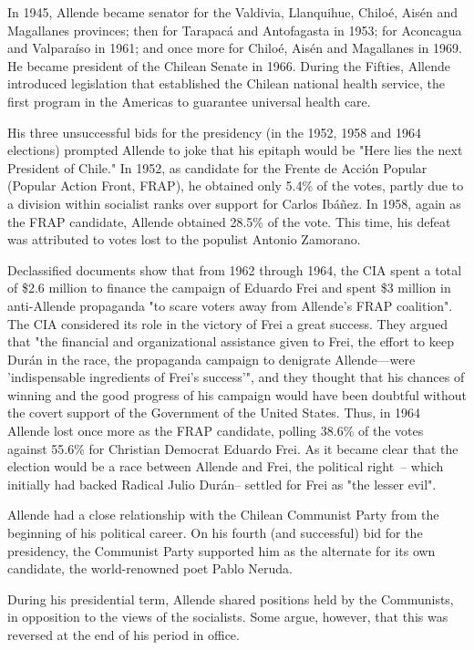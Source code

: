 In 1945, Allende became senator for the Valdivia, Llanquihue, Chiloé,
Aisén and Magallanes provinces; then for Tarapacá and Antofagasta in
1953; for Aconcagua and Valparaíso in 1961; and once more for Chiloé,
Aisén and Magallanes in 1969. He became president of the Chilean Senate
in 1966. During the Fifties, Allende introduced legislation that
established the Chilean national health service, the first program in
the Americas to guarantee universal health care.

His three unsuccessful bids for the presidency (in the 1952, 1958 and
1964 elections) prompted Allende to joke that his epitaph would be "Here
lies the next President of Chile." In 1952, as candidate for the Frente
de Acción Popular (Popular Action Front, FRAP), he obtained only 5.4\%
of the votes, partly due to a division within socialist ranks over
support for Carlos Ibáñez. In 1958, again as the FRAP candidate, Allende
obtained 28.5\% of the vote. This time, his defeat was attributed to
votes lost to the populist Antonio Zamorano.

Declassified documents show that from 1962 through 1964, the CIA spent a
total of \$2.6 million to finance the campaign of Eduardo Frei and spent
\$3 million in anti-Allende propaganda "to scare voters away from
Allende's FRAP coalition". The CIA considered its role in the victory of
Frei a great success. They argued that "the financial and organizational
assistance given to Frei, the effort to keep Durán in the race, the
propaganda campaign to denigrate Allende---were 'indispensable
ingredients of Frei's success'", and they thought that his chances of
winning and the good progress of his campaign would have been doubtful
without the covert support of the Government of the United States. Thus,
in 1964 Allende lost once more as the FRAP candidate, polling 38.6\% of
the votes against 55.6\% for Christian Democrat Eduardo Frei. As it
became clear that the election would be a race between Allende and Frei,
the political right~-- which initially had backed Radical Julio Durán--
settled for Frei as "the lesser evil".

Allende had a close relationship with the Chilean Communist Party from
the beginning of his political career. On his fourth (and successful)
bid for the presidency, the Communist Party supported him as the
alternate for its own candidate, the world-renowned poet Pablo Neruda.

During his presidential term, Allende shared positions held by the
Communists, in opposition to the views of the socialists. Some argue,
however, that this was reversed at the end of his period in office.

